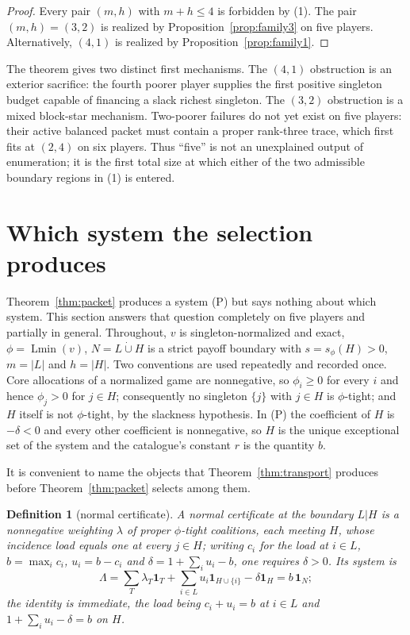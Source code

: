 \documentclass[11pt]{article}
\newtheorem{definition}[theorem]{Definition}
\newcommand{\Lmin}{\operatorname{Lmin}}
\newcommand{\one}{\mathbf 1}
\begin{document}
\begin{proof}
Every pair $(m,h)$ with $m+h\le4$ is forbidden by (1).  The pair
$(m,h)=(3,2)$ is realized by Proposition~\ref{prop:family3} on five players.
Alternatively, $(4,1)$ is realized by Proposition~\ref{prop:family1}.
\end{proof}

The theorem gives two distinct first mechanisms.  The $(4,1)$ obstruction
is an exterior sacrifice: the fourth poorer player supplies the first
positive singleton budget capable of financing a slack richest singleton.
The $(3,2)$ obstruction is a mixed block-star mechanism.  Two-poorer
failures do not yet exist on five players: their active balanced packet must
contain a proper rank-three trace, which first fits at $(2,4)$ on six
players.  Thus ``five'' is not an unexplained output of enumeration; it is
the first total size at which either of the two admissible boundary regions
in (1) is entered.

\section{Which system the selection produces}
\label{sec:selection}

Theorem~\ref{thm:packet} produces a system (P) but says nothing about which
system.  This section answers that question completely on five players and
partially in general.  Throughout, $v$ is singleton-normalized and exact,
$\phi=\Lmin(v)$, $N=L\mathbin{\dot\cup}H$ is a strict payoff boundary with
$s=s_\phi(H)>0$, $m=|L|$ and $h=|H|$.  Two conventions are used repeatedly and
recorded once.  Core allocations of a normalized game are nonnegative, so
$\phi_i\ge0$ for every $i$ and hence $\phi_j>0$ for $j\in H$; consequently no
singleton $\{j\}$ with $j\in H$ is $\phi$-tight; and $H$ itself is not
$\phi$-tight, by the slackness hypothesis.  In (P) the coefficient of $H$ is $-\delta<0$ and every other
coefficient is nonnegative, so $H$ is the unique exceptional set of the system
and the catalogue's constant $r$ is the quantity $b$.

It is convenient to name the objects that Theorem~\ref{thm:transport} produces
before Theorem~\ref{thm:packet} selects among them.

\begin{definition}[normal certificate]\label{sel:def:normal}
A \emph{normal certificate} at the boundary $L|H$ is a nonnegative weighting
$\lambda$ of proper $\phi$-tight coalitions, each meeting $H$, whose incidence
load equals one at every $j\in H$; writing $c_i$ for the load at $i\in L$,
$b=\max_i c_i$, $u_i=b-c_i$ and $\delta=1+\sum_iu_i-b$, one requires
$\delta>0$.  Its \emph{system} is
\[
 \Lambda=\sum_T\lambda_T\one_T+\sum_{i\in L}u_i\one_{H\cup\{i\}}-\delta\one_H
        =b\,\one_N ;
\]
the identity is immediate, the load being $c_i+u_i=b$ at $i\in L$ and
$1+\sum_iu_i-\delta=b$ on $H$.
\end{definition}
\end{document}
